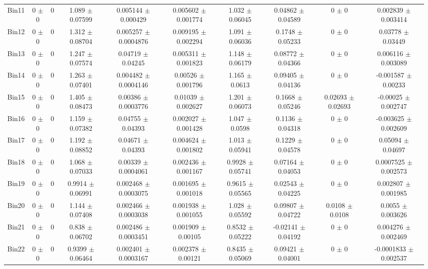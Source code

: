 \begin{tabular}{@{\extracolsep{4pt}}lccccccccc@{}}
     Bin11 & 0 $\pm$ 0 & 0 & 1.089 $\pm$ 0.07599 & 0.005144 $\pm$ 0.000429 & 0.005602 $\pm$ 0.001774 & 1.032 $\pm$ 0.06045 & 0.04862 $\pm$ 0.04589 & 0 $\pm$ 0 & 0.002839 $\pm$ 0.003414 \\ 
     Bin12 & 0 $\pm$ 0 & 0 & 1.312 $\pm$ 0.08704 & 0.005257 $\pm$ 0.0004876 & 0.009195 $\pm$ 0.002294 & 1.091 $\pm$ 0.06036 & 0.1748 $\pm$ 0.05233 & 0 $\pm$ 0 & 0.03778 $\pm$ 0.03449 \\ 
     Bin13 & 0 $\pm$ 0 & 0 & 1.247 $\pm$ 0.07574 & 0.04719 $\pm$ 0.04245 & 0.005311 $\pm$ 0.001823 & 1.148 $\pm$ 0.06179 & 0.08772 $\pm$ 0.04366 & 0 $\pm$ 0 & 0.006116 $\pm$ 0.003089 \\ 
     Bin14 & 0 $\pm$ 0 & 0 & 1.263 $\pm$ 0.07401 & 0.004482 $\pm$ 0.0004146 & 0.00526 $\pm$ 0.001796 & 1.165 $\pm$ 0.0613 & 0.09405 $\pm$ 0.04136 & 0 $\pm$ 0 & -0.001587 $\pm$ 0.00233 \\ 
     Bin15 & 0 $\pm$ 0 & 0 & 1.405 $\pm$ 0.08473 & 0.00386 $\pm$ 0.0003776 & 0.01039 $\pm$ 0.002627 & 1.201 $\pm$ 0.06073 & 0.1668 $\pm$ 0.05246 & 0.02693 $\pm$ 0.02693 & -0.00025 $\pm$ 0.002747 \\ 
     Bin16 & 0 $\pm$ 0 & 0 & 1.159 $\pm$ 0.07382 & 0.04755 $\pm$ 0.04393 & 0.002027 $\pm$ 0.001428 & 1.047 $\pm$ 0.0598 & 0.1136 $\pm$ 0.04318 & 0 $\pm$ 0 & -0.003625 $\pm$ 0.002609 \\ 
     Bin17 & 0 $\pm$ 0 & 0 & 1.192 $\pm$ 0.08852 & 0.04671 $\pm$ 0.04393 & 0.004624 $\pm$ 0.001802 & 1.013 $\pm$ 0.05941 & 0.1229 $\pm$ 0.04578 & 0 $\pm$ 0 & 0.05094 $\pm$ 0.04697 \\ 
     Bin18 & 0 $\pm$ 0 & 0 & 1.068 $\pm$ 0.07033 & 0.00339 $\pm$ 0.0004061 & 0.002436 $\pm$ 0.001167 & 0.9928 $\pm$ 0.05741 & 0.07164 $\pm$ 0.04053 & 0 $\pm$ 0 & 0.0007525 $\pm$ 0.002573 \\ 
     Bin19 & 0 $\pm$ 0 & 0 & 0.9914 $\pm$ 0.06991 & 0.002468 $\pm$ 0.0003075 & 0.001695 $\pm$ 0.001018 & 0.9615 $\pm$ 0.05565 & 0.02543 $\pm$ 0.04225 & 0 $\pm$ 0 & 0.002807 $\pm$ 0.001985 \\ 
     Bin20 & 0 $\pm$ 0 & 0 & 1.144 $\pm$ 0.07408 & 0.002466 $\pm$ 0.0003038 & 0.001938 $\pm$ 0.001055 & 1.028 $\pm$ 0.05592 & 0.09807 $\pm$ 0.04722 & 0.0108 $\pm$ 0.0108 & 0.0055 $\pm$ 0.003626 \\ 
     Bin21 & 0 $\pm$ 0 & 0 & 0.838 $\pm$ 0.06702 & 0.002486 $\pm$ 0.0003451 & 0.001909 $\pm$ 0.00105 & 0.8532 $\pm$ 0.05222 & -0.02141 $\pm$ 0.04192 & 0 $\pm$ 0 & 0.004276 $\pm$ 0.002469 \\ 
     Bin22 & 0 $\pm$ 0 & 0 & 0.9399 $\pm$ 0.06464 & 0.002401 $\pm$ 0.0003167 & 0.002378 $\pm$ 0.00121 & 0.8435 $\pm$ 0.05069 & 0.09421 $\pm$ 0.04001 & 0 $\pm$ 0 & -0.0001833 $\pm$ 0.002537 \\ 

\end{tabular}
